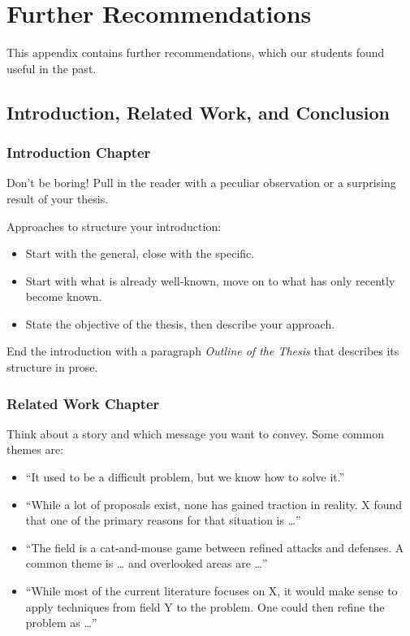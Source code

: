  
\chapter{Further Recommendations}
\label{appendixa}

This appendix contains further recommendations, which our students found useful in the past.

\section{Introduction, Related Work, and Conclusion}

\subsection{Introduction Chapter}

Don’t be boring! Pull in the reader with a peculiar observation or a surprising result of your thesis.

Approaches to structure your introduction:
\begin{itemize}
\item Start with the general, close with the specific.
\item Start with what is already well-known, move on to what has only recently become known.
\item State the objective of the thesis, then describe your approach.
\end{itemize}

End the introduction with a paragraph \emph{Outline of the Thesis} that describes its structure in prose.

\subsection{Related Work Chapter}

Think about a story and which message you want to convey. Some common themes are:
\begin{itemize}
\item “It used to be a difficult problem, but we know how to solve it.”
\item “While a lot of proposals exist, none has gained traction in reality. X found that one of the primary reasons for that situation is …”
\item “The field is a cat-and-mouse game between refined attacks and defenses. A common theme is … and overlooked areas are …”
\item “While most of the current literature focuses on X, it would make sense to apply techniques from field Y to the problem. One could then refine the problem as …”
\end{itemize}

